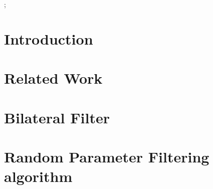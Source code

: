 \documentclass[review]{acmsiggraph}
\begin{document}

\begin{CRcatlist}
  ;
\end{CRcatlist}


\keywordlist


\TOGlinkslist


\copyrightspace


\section{Introduction}


\section{Related Work}


\section{Bilateral Filter}


\section{Random Parameter Filtering algorithm}

\end{document}
